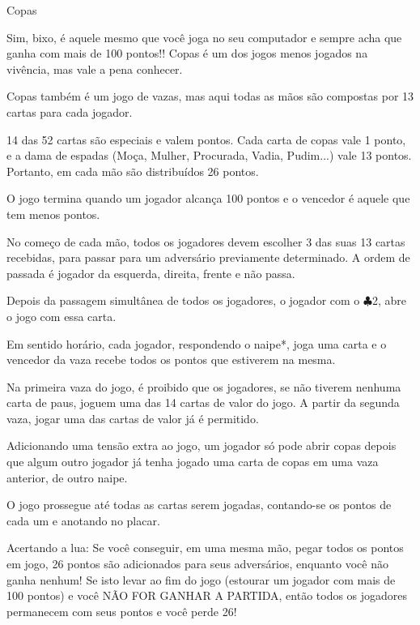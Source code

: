 \begin{subsecao}{Copas}

Sim, bixo, é aquele mesmo que você joga no seu computador e sempre acha que
ganha com mais de 100 pontos!! Copas é um dos jogos menos jogados na vivência,
mas vale a pena conhecer.

Copas também é um jogo de vazas, mas aqui todas as mãos são compostas por 13
cartas para cada jogador.

14 das 52 cartas são especiais e valem pontos. Cada carta de copas vale 1
ponto, e a dama de espadas (Moça, Mulher, Procurada, Vadia, Pudim...) vale 13
pontos. Portanto, em cada mão são distribuídos 26 pontos.

O jogo termina quando um jogador alcança 100 pontos e o vencedor é aquele que
tem menos pontos.

No começo de cada mão, todos os jogadores devem escolher 3 das suas 13 cartas
recebidas, para passar para um adversário previamente determinado. A ordem de
passada é jogador da esquerda, direita, frente e não passa.

Depois da passagem simultânea de todos os jogadores, o jogador com
o $\clubsuit$2, abre o jogo com essa carta.

Em sentido horário, cada jogador, respondendo o naipe*, joga uma carta e o
vencedor da vaza recebe todos os pontos que estiverem na mesma.

Na primeira vaza do jogo, é proibido que os jogadores, se não tiverem nenhuma
carta de paus, joguem uma das 14 cartas de valor do jogo. A partir da segunda
vaza, jogar uma das cartas de valor já é permitido.

Adicionando uma tensão extra ao jogo, um jogador só pode abrir copas depois que
algum outro jogador já tenha jogado uma carta de copas em uma vaza anterior, de
outro naipe.

O jogo prossegue até todas as cartas serem jogadas, contando-se os pontos de
cada um e anotando no placar.

Acertando a lua: Se você conseguir, em uma mesma mão, pegar todos os pontos em
jogo, 26 pontos são adicionados para seus adversários, enquanto você não ganha
nenhum! Se isto levar ao fim do jogo (estourar um jogador com mais de 100
pontos) e você NÃO FOR GANHAR A PARTIDA, então todos os jogadores permanecem
com seus pontos e você perde 26!

\end{subsecao}
